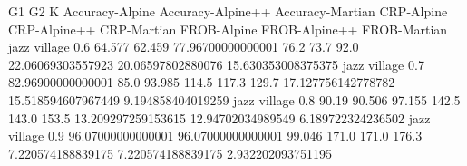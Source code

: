 G1 G2 K Accuracy-Alpine Accuracy-Alpine++ Accuracy-Martian CRP-Alpine CRP-Alpine++ CRP-Martian FROB-Alpine FROB-Alpine++ FROB-Martian
jazz village 0.6 64.577 62.459 77.96700000000001 76.2 73.7 92.0 22.06069303557923 20.06597802880076 15.630353008375375
jazz village 0.7 82.96900000000001 85.0 93.985 114.5 117.3 129.7 17.127756142778782 15.518594607967449 9.194858404019259
jazz village 0.8 90.19 90.506 97.155 142.5 143.0 153.5 13.209297259153615 12.94702034989549 6.189722324236502
jazz village 0.9 96.07000000000001 96.07000000000001 99.046 171.0 171.0 176.3 7.220574188839175 7.220574188839175 2.932202093751195
